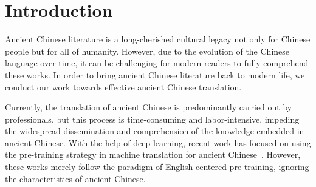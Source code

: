 \section{Introduction}







Ancient Chinese literature is a long-cherished cultural legacy not only for Chinese people but for all of humanity. However, due to the evolution of the Chinese language over time, it can be challenging for modern readers to fully comprehend these works. In order to bring ancient Chinese literature back to modern life, we conduct our work towards effective ancient Chinese translation.

Currently, the translation of ancient Chinese is predominantly carried out by professionals, but this process is time-consuming and labor-intensive, impeding the widespread dissemination and comprehension of the knowledge embedded in ancient Chinese.
With the help of deep learning, recent work has focused on using the pre-training strategy in machine translation for ancient Chinese~\cite{DBLP:journals/corr/abs-2009-11473, DBLP:conf/nlpcc/YangCC21, DBLP:conf/acl-lchange/ChangSYD21}. However, these works merely follow the paradigm of English-centered pre-training, ignoring the characteristics of ancient Chinese.

